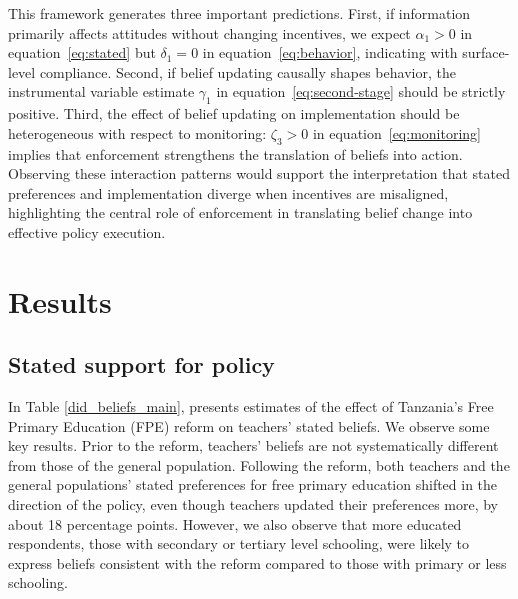 \documentclass[hidelinks,12pt]{article}
\begin{document}
\begin{singlespace}
This framework generates three  important predictions. First, if information primarily affects attitudes without changing incentives, we expect $\alpha_1>0$ in equation~\eqref{eq:stated} but $\delta_1=0$ in equation~\eqref{eq:behavior}, indicating with surface-level compliance. Second, if belief updating causally shapes behavior, the instrumental variable estimate $\gamma_1$ in equation~\eqref{eq:second-stage} should be strictly positive. Third, the effect of belief updating on implementation should be heterogeneous with respect to monitoring: $\zeta_3>0$ in equation~\eqref{eq:monitoring} implies that enforcement strengthens the translation of beliefs into action. Observing these interaction patterns would support the interpretation that stated preferences and implementation diverge when incentives are misaligned, highlighting the central role of enforcement in translating belief change into effective policy execution.




\section{Results}

\subsection{Stated support for policy}
In Table \ref{did_beliefs_main}, presents estimates of the effect of Tanzania’s Free Primary Education (FPE) reform on teachers’ stated beliefs. We observe some key results. Prior to the reform, teachers’ beliefs are not systematically different from those of the general population. Following the reform, both teachers and the general populations' stated preferences for free primary education shifted in the direction of the policy, even though teachers updated their preferences more, by about 18 percentage points. However, we also observe that more educated respondents, those with secondary or tertiary level schooling, were likely to express beliefs consistent with the reform compared to those with primary or less schooling.



\end{singlespace}
\end{document}
